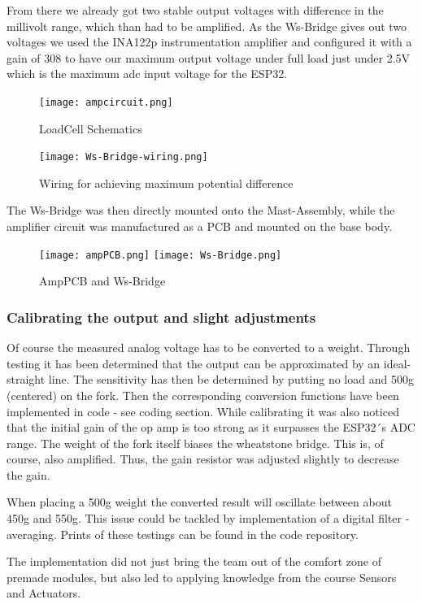 \documentclass[../report.tex]{subfiles}
\begin{document}
From there we already got two stable output voltages with difference in the millivolt range, 
which than had to be amplified.
As the Ws-Bridge gives out two voltages we used the INA122p instrumentation amplifier and 
configured it with a gain of 308 to have our maximum output voltage under full load just 
under 2.5V which is the maximum adc input voltage for the ESP32.

\begin{figure}[H]
  \centering
  \texttt{[image: ampcircuit.png]}
  \caption{LoadCell Schematics}
\end{figure} 
\begin{figure}[H]
  \centering
  \texttt{[image: Ws-Bridge-wiring.png]}
  \caption{Wiring for achieving maximum potential difference}
\end{figure}

The Ws-Bridge was then directly mounted onto the Mast-Assembly, while the amplifier circuit 
was manufactured as a PCB and mounted on the base body.

\begin{figure}[H]
  \centering
  \texttt{[image: ampPCB.png]}
  \texttt{[image: Ws-Bridge.png]}
  \caption{AmpPCB and Ws-Bridge}
\end{figure} 

\subsubsection{Calibrating the output and slight adjustments}
Of course the measured analog voltage has to be converted to a weight.
Through testing it has been determined that the output can be approximated
by an ideal-straight line. The sensitivity has then be determined by putting no load
and 500g (centered) on the fork. Then the corresponding conversion functions have been 
implemented in code - see coding section.
While calibrating it was also noticed that the initial gain of the op amp is too strong as it 
surpasses the ESP32´s ADC range.
The weight of the fork itself biases the wheatstone bridge. This is, of course, also amplified.
Thus, the gain resistor was adjusted slightly to decrease the gain.

\quad
When placing a 500g weight the converted result will oscillate between about 450g and 550g.
This issue could be tackled by implementation of a digital filter - averaging. Prints of these testings
can be found in the code repository.
\quad

The implementation did not just bring the team out of the comfort zone of premade modules, but
also led to applying knowledge from the course Sensors and Actuators.
\end{document}
